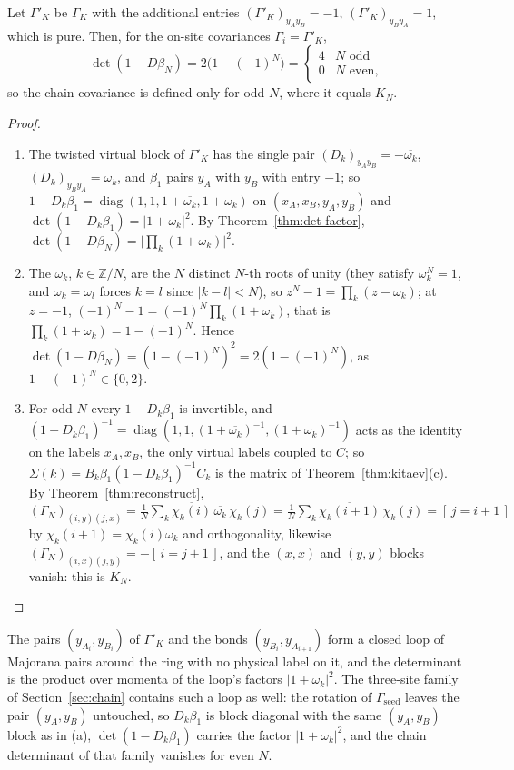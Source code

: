 \begin{proposition}\label{prop:loop}
Let $\Gamma'_K$ be $\Gamma_K$ with the additional entries
$(\Gamma'_K)_{y_Ay_B}=-1$, $(\Gamma'_K)_{y_By_A}=1$, which is pure. Then, for the on-site
covariances $\Gamma_i=\Gamma'_K$,
\[
 \det(1-D\beta_N)=2\bigl(1-(-1)^N\bigr)=\begin{cases}4&N\text{ odd}\\0&N\text{ even,}\end{cases}
\]
so the chain covariance is defined only for odd $N$, where it equals $K_N$.
\end{proposition}
\begin{proof}
\begin{enumerate}
\item[(a)] The twisted virtual block of $\Gamma'_K$ has the single pair
$(D_k)_{y_Ay_B}=-\overline{\omega_k}$, $(D_k)_{y_By_A}=\omega_k$, and $\beta_1$ pairs $y_A$
with $y_B$ with entry $-1$; so $1-D_k\beta_1=\operatorname{diag}(1,1,1+\overline{\omega_k},1+\omega_k)$
on $(x_A,x_B,y_A,y_B)$ and $\det(1-D_k\beta_1)=|1+\omega_k|^2$. By
Theorem~\ref{thm:det-factor}, $\det(1-D\beta_N)=\bigl|\prod_k(1+\omega_k)\bigr|^2$.
\item[(b)] The $\omega_k$, $k\in\mathbb Z/N$, are the $N$ distinct $N$-th roots of unity
(they satisfy $\omega_k^N=1$, and $\omega_k=\omega_l$ forces $k=l$ since
$|k-l|<N$), so $z^N-1=\prod_k(z-\omega_k)$; at $z=-1$,
$(-1)^N-1=(-1)^N\prod_k(1+\omega_k)$, that is $\prod_k(1+\omega_k)=1-(-1)^N$. Hence
$\det(1-D\beta_N)=(1-(-1)^N)^2=2(1-(-1)^N)$, as $1-(-1)^N\in\{0,2\}$.
\item[(c)] For odd $N$ every $1-D_k\beta_1$ is invertible, and
$(1-D_k\beta_1)^{-1}=\operatorname{diag}(1,1,(1+\overline{\omega_k})^{-1},(1+\omega_k)^{-1})$ acts as the
identity on the labels $x_A,x_B$, the only virtual labels coupled to $C$; so
$\Sigma(k)=B_k\beta_1(1-D_k\beta_1)^{-1}C_k$ is the matrix of Theorem~\ref{thm:kitaev}(c).
By Theorem~\ref{thm:reconstruct},
$(\Gamma_N)_{(i,y)(j,x)}=\frac1N\sum_k\overline{\chi_k(i)}\,\overline{\omega_k}\,\chi_k(j)
=\frac1N\sum_k\overline{\chi_k(i+1)}\,\chi_k(j)=[\,j=i+1\,]$ by
$\chi_k(i+1)=\chi_k(i)\omega_k$ and orthogonality, likewise
$(\Gamma_N)_{(i,x)(j,y)}=-[\,i=j+1\,]$, and the $(x,x)$ and $(y,y)$ blocks vanish: this is
$K_N$. \qedhere
\end{enumerate}
\end{proof}
The pairs $(y_{A_i},y_{B_i})$ of $\Gamma'_K$ and the bonds $(y_{B_i},y_{A_{i+1}})$ form a
closed loop of Majorana pairs around the ring with no physical label on it, and the
determinant is the product over momenta of the loop's factors $|1+\omega_k|^2$. The three-site family of Section~\ref{sec:chain} contains such a
loop as well: the rotation of $\Gamma_{\mathrm{seed}}$ leaves the pair $(y_A,y_B)$ untouched,
so $D_k\beta_1$ is block diagonal with the same $(y_A,y_B)$ block as in (a),
$\det(1-D_k\beta_1)$ carries the factor $|1+\omega_k|^2$, and the chain determinant of that
family vanishes for even $N$.

